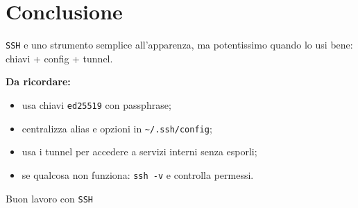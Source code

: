 \documentclass[a4paper,11pt]{article}
\begin{document}
\section{Conclusione}
\texttt{SSH} e uno strumento semplice all'apparenza, ma potentissimo quando lo usi bene: chiavi + config + tunnel.

\begin{tipbox}
\textbf{Da ricordare:}
\begin{itemize}[leftmargin=1.2cm]
    \item usa chiavi \texttt{ed25519} con passphrase;
    \item centralizza alias e opzioni in \texttt{\textasciitilde/.ssh/config};
    \item usa i tunnel per accedere a servizi interni senza esporli;
    \item se qualcosa non funziona: \texttt{ssh -v} e controlla permessi.
\end{itemize}
\end{tipbox}

\vfill
\begin{center}
\textcolor{AccentColor}{\large Buon lavoro con \texttt{SSH}}
\end{center}
\end{document}

